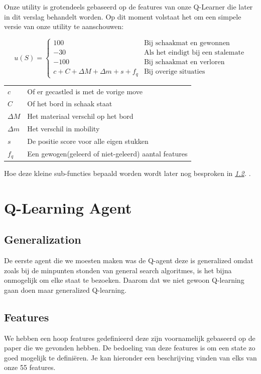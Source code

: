 \documentclass[a4paper,openany]{uantwerpenassignment}
\makeatletter
\newenvironment{conditions}
  {\par\vspace{\abovedisplayskip}\noindent\begin{tabular}{>{$}l<{$} @{${}={}$} l}}
  {\end{tabular}\par\vspace{\belowdisplayskip}}
\newcommand{\reference}[1]{\textit{\ref{#1}. \nameref{#1}}}
\makeatother
\begin{document}
Onze utility is grotendeels gebaseerd op de features van onze Q-Learner die later in dit verslag behandelt worden.
Op dit moment volstaat het om een simpele versie van onze utility te aanschouwen:

$$
u(S) = 
\begin{cases}
    100 &\mbox{Bij schaakmat en gewonnen}\\
    -30 &\mbox{Als het eindigt bij een stalemate}\\
    -100 &\mbox{Bij schaakmat en verloren}\\
    c + C + \Delta M + \Delta m + s + f_q &\mbox{Bij overige situaties}
\end{cases}
$$

\begin{conditions}
    c & Of er gecastled is met de vorige move\\
    C & Of het bord in schaak staat\\
    \Delta M & Het materiaal verschil op het bord\\
    \Delta m & Het verschil in mobility\\
    s & De positie score voor alle eigen stukken\\
    f_q & Een gewogen(geleerd of niet-geleerd) aantal features
\end{conditions}

Hoe deze kleine sub-functies bepaald worden wordt later nog besproken in \reference{features}.

\chapter{Q-Learning Agent}

\section{Generalization}

De eerste agent die we moesten maken was de Q-agent deze is generalized omdat zoals bij de minpunten stonden van general search algoritmes, is het bijna onmogelijk om elke staat te bezoeken. Daarom dat we niet gewoon Q-learning gaan doen maar generalized Q-learning.

\section{Features}
\label{features}

We hebben een hoop features gedefinieerd deze zijn voornamelijk gebaseerd op de paper\cite{rl} die we gevonden hebben. De bedoeling van deze features is om een state zo goed mogelijk te definiëren. Je kan hieronder een beschrijving vinden van elks van onze 55 features.
\end{document}

